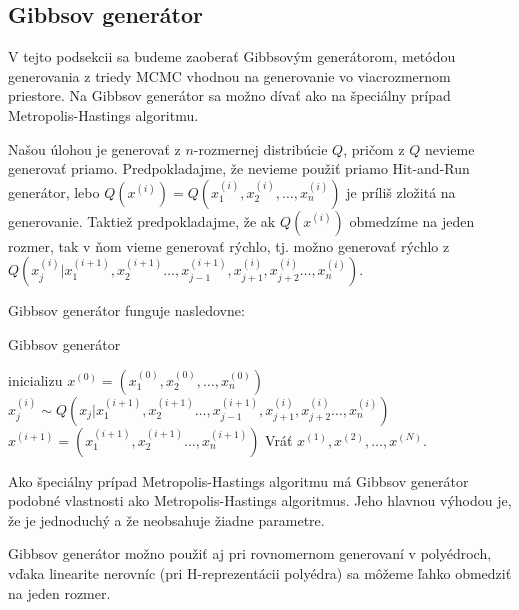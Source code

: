 \subsection{Gibbsov generátor}

V tejto podsekcii sa budeme zaoberať Gibbsovým generátorom, metódou generovania z triedy MCMC vhodnou na generovanie vo viacrozmernom priestore. Na Gibbsov generátor sa možno dívať ako na špeciálny prípad Metropolis-Hastings algoritmu.

Našou úlohou je generovať z $n$-rozmernej distribúcie $Q$, pričom z $Q$ nevieme generovať priamo. Predpokladajme, že nevieme použiť priamo Hit-and-Run generátor, lebo $Q(x^{(i)})=Q(x^{(i)}_1, x^{(i)}_2, \dots, x^{(i)}_n)$ je príliš zložitá na generovanie. Taktiež predpokladajme, že ak $Q(x^{(i)})$ obmedzíme na jeden rozmer, tak v ňom vieme generovať rýchlo, tj. možno generovať rýchlo z $Q(x^{(i)}_j | x^{(i+1)}_1, x^{(i+1)}_2 \dots, x^{(i+1)}_{j-1}, x^{(i)}_{j+1}, x^{(i)}_{j+2} \dots, x^{(i)}_n)$.

Gibbsov generátor funguje nasledovne:

\begin{algorithm}[H]
	\caption{Gibbsov generátor \cite{mcmc_intro_mackay}}
	\label{gibbs}
	\begin{algorithmic}[1]
		\State inicializu $x^{(0)} = (x^{(0)}_1, x^{(0)}_2, \dots, x^{(0)}_n)$
				\State $x^{(i)}_j \sim Q(x_j | x^{(i+1)}_1, x^{(i+1)}_2 \dots, x^{(i+1)}_{j-1}, x^{(i)}_{j+1}, x^{(i)}_{j+2} \dots, x^{(i)}_n)$
			\EndFor
			\State $x^{(i+1)}= (x^{(i+1)}_1, x^{(i+1)}_2 \dots, x^{(i+1)}_n)$
		\EndFor
		\State Vráť ${x^{(1)},x^{(2)},\dots,x^{(N)}}$.
	\end{algorithmic}
\end{algorithm}

Ako špeciálny prípad Metropolis-Hastings algoritmu má Gibbsov generátor podobné vlastnosti ako Metropolis-Hastings algoritmus. Jeho hlavnou výhodou je, že je jednoduchý a že neobsahuje žiadne parametre.

Gibbsov generátor možno použiť aj pri rovnomernom generovaní v polyédroch, vďaka linearite nerovníc (pri H-reprezentácii polyédra) sa môžeme ľahko obmedziť na jeden rozmer.